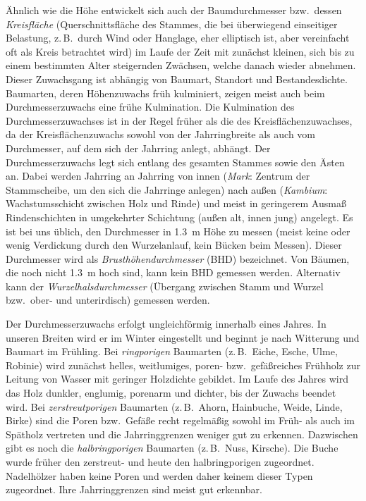 \documentclass[twocolumn, paper=a4, fontsize=10pt]{scrartcl}
\begin{document}
Ähnlich wie die Höhe entwickelt sich auch der Baumdurchmesser bzw.\ dessen \emph{Kreisfläche} (Querschnittsfläche des Stammes, die bei überwiegend einseitiger Belastung, z.\,B.\ durch Wind oder Hanglage, eher elliptisch ist, aber vereinfacht oft als Kreis betrachtet wird) im Laufe der Zeit mit zunächst kleinen, sich bis zu einem bestimmten Alter steigernden Zwächsen, welche danach wieder abnehmen. Dieser Zuwachsgang ist abhängig von Baumart, Standort und Bestandesdichte. Baumarten, deren Höhenzuwachs früh kulminiert, zeigen meist auch beim Durchmesserzuwachs eine frühe Kulmination. Die Kulmination des Durchmesserzuwachses ist in der Regel früher als die des Kreisflächenzuwachses, da der Kreisflächenzuwachs sowohl von der Jahrringbreite als auch vom Durchmesser, auf dem sich der Jahrring anlegt, abhängt. Der Durchmesserzuwachs legt sich entlang des gesamten Stammes sowie den Ästen an. Dabei werden Jahrring an Jahrring von innen (\emph{Mark}: Zentrum der Stammscheibe, um den sich die Jahrringe anlegen) nach außen (\emph{Kambium}: Wachstumsschicht zwischen Holz und Rinde) und meist in geringerem Ausmaß Rindenschichten in umgekehrter Schichtung (außen alt, innen jung) angelegt. Es ist bei uns üblich, den Durchmesser in \qty{1.3}{\m} Höhe zu messen (meist keine oder wenig Verdickung durch den Wurzelanlauf, kein Bücken beim Messen). Dieser Durchmesser wird als \emph{Brusthöhendurchmesser} (BHD) bezeichnet. Von Bäumen, die noch nicht \qty{1.3}{\m} hoch sind, kann kein BHD gemessen werden. Alternativ kann der \emph{Wurzelhalsdurchmesser} (Übergang zwischen Stamm und Wurzel bzw.\ ober- und unterirdisch) gemessen werden.

Der Durchmesserzuwachs erfolgt ungleichförmig innerhalb eines Jahres. In unseren Breiten wird er im Winter eingestellt und beginnt je nach Witterung und Baumart im Frühling. Bei \emph{ringporigen} Baumarten (z.\,B.\ Eiche, Esche, Ulme, Robinie) wird zunächst helles, weitlumiges, poren- bzw.\ gefäßreiches Frühholz zur Leitung von Wasser mit geringer Holzdichte gebildet. Im Laufe des Jahres wird das Holz dunkler, englumig, porenarm und dichter, bis der Zuwachs beendet wird. Bei \emph{zerstreutporigen} Baumarten (z.\,B.\ Ahorn, Hainbuche, Weide, Linde, Birke) sind die Poren bzw.\ Gefäße recht regelmäßig sowohl im Früh- als auch im Spätholz vertreten und die Jahrringgrenzen weniger gut zu erkennen. Dazwischen gibt es noch die \emph{halbringporigen} Baumarten (z.\,B.\ Nuss, Kirsche). Die Buche wurde früher den zerstreut- und heute den halbringporigen zugeordnet. Nadelhölzer haben keine Poren und werden daher keinem dieser Typen zugeordnet. Ihre Jahrringgrenzen sind meist gut erkennbar.
\end{document}

